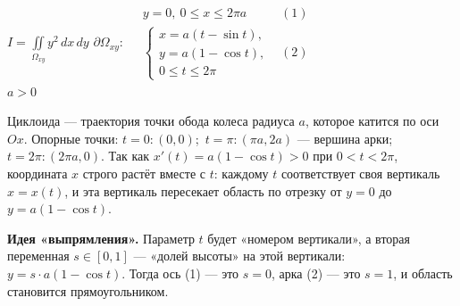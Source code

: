 \begin{shapka}
$\displaystyle I=\iint\limits_{\Omega_{xy}}y^2\,dx\,dy$
\tcblower
$\partial\Omega_{xy}:\quad
\begin{array}{ll}
y=0,\ 0\leqslant x\leqslant 2\pi a & (1)\\[1mm]
\begin{cases}x=a(t-\sin t),\\ y=a(1-\cos t),\\ 0\leqslant t\leqslant2\pi\end{cases} & (2)
\end{array}$\\[1mm] $a>0$
\end{shapka}

Циклоида --- траектория точки обода колеса радиуса $a$, которое катится по оси $Ox$. Опорные точки: $t=0\colon(0,0)$;\ $t=\pi\colon(\pi a,2a)$ --- вершина арки;\ $t=2\pi\colon(2\pi a,0)$.
Так как $x'(t)=a(1-\cos t)>0$ при $0<t<2\pi$, координата $x$ строго растёт вместе с $t$: каждому $t$ соответствует своя вертикаль $x=x(t)$, и эта вертикаль пересекает область по отрезку от $y=0$ до $y=a(1-\cos t)$.

\textbf{Идея «выпрямления».} Параметр $t$ будет «номером вертикали», а вторая переменная $s\in[0,1]$ --- «долей высоты» на этой вертикали: $y=s\cdot a(1-\cos t)$. Тогда ось (1) --- это $s=0$, арка (2) --- это $s=1$, и область становится прямоугольником.

